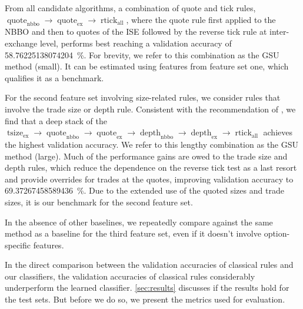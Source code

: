 From all candidate algorithms, a combination of quote and tick rules, $\operatorname{quote}_{\mathrm{nbbo}} \to \operatorname{quote}_{\mathrm{ex}} \to \operatorname{rtick}_{\mathrm{all}}$, where the quote rule first applied to the \gls{NBBO} and then to quotes of the \gls{ISE} followed by the reverse tick rule at inter-exchange level, performs best reaching a validation accuracy of \SI{58.76225138074204}{\percent}. For brevity, we refer to this combination as the \gls{GSU} method (small). It can be estimated using features from feature set one, which qualifies it as a benchmark.

For the second feature set involving size-related rules, we consider rules that involve the trade size or depth rule. Consistent with the recommendation of \textcite[][14]{grauerOptionTradeClassification2022}, we find that a deep stack of the $\operatorname{tsize}_{\mathrm{ex}} \to \operatorname{quote}_{\mathrm{nbbo}} \to \operatorname{quote}_{\mathrm{ex}} \to \operatorname{depth}_{\mathrm{nbbo}} \to \operatorname{depth}_{\mathrm{ex}} \to \operatorname{rtick}_{\mathrm{all}}$ achieves the highest validation accuracy. We refer to this lengthy combination as the \gls{GSU} method (large). Much of the performance gains are owed to the trade size and depth rules, which reduce the dependence on the reverse tick test as a last resort and provide overrides for trades at the quotes, improving validation accuracy to \SI{69.37267458589436}{\percent}. Due to the extended use of the quoted sizes and trade sizes, it is our benchmark for the second feature set.

In the absence of other baselines, we repeatedly compare against the same method as a baseline for the third feature set, even if it doesn't involve option-specific features.

In the direct comparison between the validation accuracies of classical rules and our classifiers, the validation accuracies of classical rules considerably underperform the learned classifier. \cref{sec:results} discusses if the results hold for the test sets. But before we do so, we present the metrics used
for evaluation.